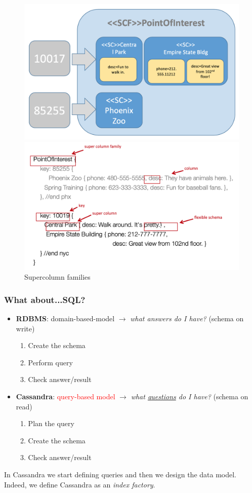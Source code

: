 \documentclass[10pt,a4paper]{article}
\begin{document}
\begin{figure}[h!]
\centering
\begin{minipage}{.5\textwidth}
  \centering
  \includegraphics[width=.8\linewidth]{images/cassandra-super-column-family}
\end{minipage}%
\begin{minipage}{.5\textwidth}
  \centering
  \includegraphics[width=.8\linewidth]{images/cassandra-super-column-family2}
\end{minipage}
\caption{Supercolumn families}
\end{figure}

\subsubsection{What about...SQL?}
\begin{itemize}
	\item \textbf{RDBMS}: domain-based-model $\rightarrow$ \textit{what answers do I have?} (schema on write)
	\begin{enumerate}
		\item Create the schema
		\item Perform query
		\item Check answer/result
	\end{enumerate}
	\item \textbf{Cassandra}: \textcolor{red}{query-based model} $\rightarrow$ \textit{what \uline{questions} do I have?} (schema on read)
	\begin{enumerate}
		\item Plan the query
		\item Create the schema
		\item Check answer/result
	\end{enumerate}
\end{itemize}
\pagebreak
In Cassandra we start defining queries and then we design the data model. Indeed, we define Cassandra as an \textit{index factory}.
\end{document}
